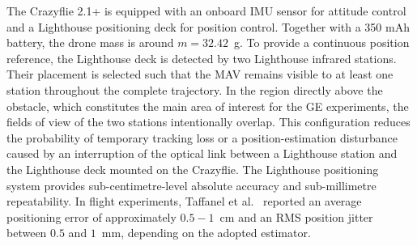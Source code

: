\documentclass[journal]{IEEEtran}
\begin{document}
The Crazyflie 2.1+ is equipped with an onboard IMU sensor for attitude control and a Lighthouse positioning deck for position control. Together with a 350 mAh battery, the drone mass is around $m=32.42$~g. To provide a continuous position reference, the Lighthouse deck is detected by two Lighthouse infrared stations. Their placement is selected such that the MAV remains visible to at least one station throughout the complete trajectory. In the region directly above the obstacle, which constitutes the main area of interest for the GE experiments, the fields of view of the two stations intentionally overlap. This configuration reduces the probability of temporary tracking loss or a position-estimation disturbance caused by an interruption of the optical link between a Lighthouse station and the Lighthouse deck mounted on the Crazyflie. The Lighthouse positioning system provides sub-centimetre-level absolute accuracy and sub-millimetre repeatability. In flight experiments, Taffanel et al.~\cite{Taffanel2021Lighthouse} reported an average positioning error of approximately $0.5-1$~cm and an RMS position jitter between $0.5$ and $1$~mm, depending on the adopted estimator. 
\end{document}
